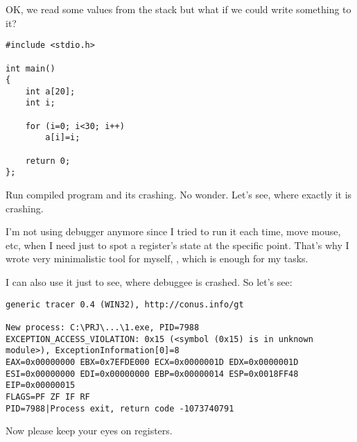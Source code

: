 {OK, we read some values from the stack  but what if we could write something to it?}


\begin{lstlisting}
#include <stdio.h>

int main() 
{
	int a[20];
	int i;

	for (i=0; i<30; i++)
		a[i]=i;

	return 0;
};
\end{lstlisting}




{Run compiled program and its crashing. No wonder. Let's see, where exactly it is crashing.}

{I'm not using debugger anymore since I tried to run it each time, move mouse, etc, when I need just to
spot a register's state at the specific point.
That's why I wrote very minimalistic tool for myself, \tracer, which is enough for my tasks.}

{I can also use it just to see, where \gls{debuggee} is crashed.
So let's see:}

\begin{lstlisting}
generic tracer 0.4 (WIN32), http://conus.info/gt

New process: C:\PRJ\...\1.exe, PID=7988
EXCEPTION_ACCESS_VIOLATION: 0x15 (<symbol (0x15) is in unknown module>), ExceptionInformation[0]=8
EAX=0x00000000 EBX=0x7EFDE000 ECX=0x0000001D EDX=0x0000001D
ESI=0x00000000 EDI=0x00000000 EBP=0x00000014 ESP=0x0018FF48
EIP=0x00000015
FLAGS=PF ZF IF RF
PID=7988|Process exit, return code -1073740791
\end{lstlisting}

{Now please keep your eyes on registers.}

